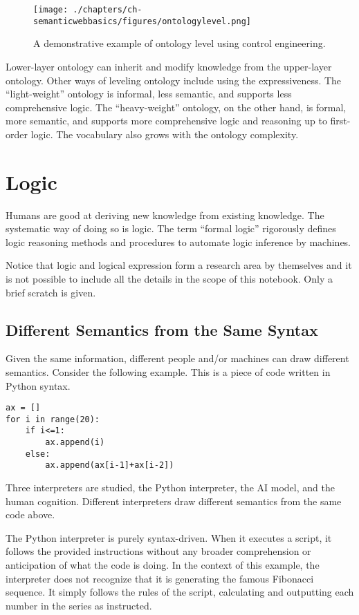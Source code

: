 \begin{figure}[htbp]
	\centering
	\texttt{[image: ./chapters/ch-semanticwebbasics/figures/ontologylevel.png]}
	\caption{A demonstrative example of ontology level using control engineering.}
	\label{fig:ontologylevel}
\end{figure}

Lower-layer ontology can inherit and modify knowledge from the upper-layer ontology. Other ways of leveling ontology include using the expressiveness. The ``light-weight'' ontology is informal, less semantic, and supports less comprehensive logic. The ``heavy-weight'' ontology, on the other hand, is formal, more semantic, and supports more comprehensive logic and reasoning up to first-order logic. The vocabulary also grows with the ontology complexity.

\section{Logic} \label{sec:logic}

Humans are good at deriving new knowledge from existing knowledge. The systematic way of doing so is logic. The term ``formal logic'' rigorously defines logic reasoning methods and procedures to automate logic inference by machines.

Notice that logic and logical expression form a research area by themselves and it is not possible to include all the details in the scope of this notebook. Only a brief scratch is given.

\subsection{Different Semantics from the Same Syntax}

Given the same information, different people and/or machines can draw different semantics. Consider the following example. This is a piece of code written in Python syntax.
\begin{lstlisting}
ax = []
for i in range(20):
	if i<=1:
		ax.append(i)
	else:
		ax.append(ax[i-1]+ax[i-2])
\end{lstlisting}
Three interpreters are studied, the Python interpreter, the AI model, and the human cognition. Different interpreters draw different semantics from the same code above.

The Python interpreter is purely syntax-driven. When it executes a script, it follows the provided instructions without any broader comprehension or anticipation of what the code is doing. In the context of this example, the interpreter does not recognize that it is generating the famous Fibonacci sequence. It simply follows the rules of the script, calculating and outputting each number in the series as instructed.

